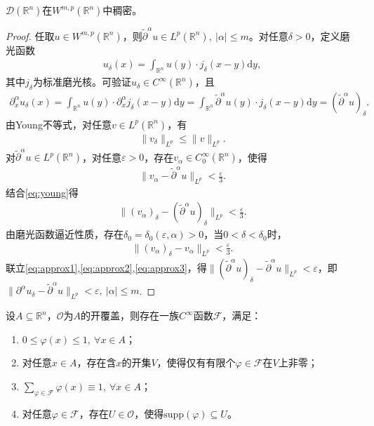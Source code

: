 \documentclass[../../main.tex]{subfiles}%
\begin{document}
\begin{theorem}
$\mathscr{D}(\mathbb{R}^{n})$在$W^{m,p}(\mathbb{R}^{n})$中稠密。
\end{theorem}

\begin{proof}
任取$u\in W^{m,p}(\mathbb{R}^{n})$，则$\widetilde{\partial}^{\alpha}u\in L^{p}(\mathbb{R}^{n}),\ |\alpha|\leqslant m$。对任意$\delta>0$，定义磨光函数
\begin{align}
u_{\delta}(x)=\int_{\mathbb{R}^{n}}u(y)\cdot j_{\delta}(x-y)\mathrm{d}y,\label{eq:mollify}
\end{align}
其中$j_{\delta}$为标准磨光核。可验证$u_{\delta}\in C^{\infty}(\mathbb{R}^{n})$，且
\begin{align*}
\partial_{x}^{\alpha}u_{\delta}(x)=\int_{\mathbb{R}^{n}}u(y)\cdot\partial_{x}^{\alpha}j_{\delta}(x-y)\mathrm{d}y=\int_{\mathbb{R}^{n}}\widetilde{\partial}^{\alpha}u(y)\cdot j_{\delta}(x-y)\mathrm{d}y=(\widetilde{\partial}^{\alpha}u)_{\delta}.
\end{align*}
由Young不等式，对任意$v\in L^{p}(\mathbb{R}^{n})$，有
\begin{align}
\|v_{\delta}\|_{L^{p}}\leqslant\|v\|_{L^{p}}.\label{eq:young}
\end{align}
对$\widetilde{\partial}^{\alpha}u\in L^{p}(\mathbb{R}^{n})$，对任意$\varepsilon>0$，存在$v_{\alpha}\in C_{0}^{\infty}(\mathbb{R}^{n})$，使得
\begin{align}
\|v_{\alpha}-\widetilde{\partial}^{\alpha}u\|_{L^{p}}<\frac{\varepsilon}{3}.\label{eq:approx1}
\end{align}
结合\eqref{eq:young}得
\begin{align}
\|(v_{\alpha})_{\delta}-(\widetilde{\partial}^{\alpha}u)_{\delta}\|_{L^{p}}<\frac{\varepsilon}{3}.\label{eq:approx2}
\end{align}
由磨光函数逼近性质，存在$\delta_{0}=\delta_{0}(\varepsilon,\alpha)>0$，当$0<\delta<\delta_{0}$时，
\begin{align}
\|(v_{\alpha})_{\delta}-v_{\alpha}\|_{L^{p}}<\frac{\varepsilon}{3}.\label{eq:approx3}
\end{align}
联立\eqref{eq:approx1},\eqref{eq:approx2},\eqref{eq:approx3}，得$\|(\widetilde{\partial}^{\alpha}u)_{\delta}-\widetilde{\partial}^{\alpha}u\|_{L^{p}}<\varepsilon$，即$\|\partial^{\alpha}u_{\delta}-\widetilde{\partial}^{\alpha}u\|_{L^{p}}<\varepsilon,\ |\alpha|\leqslant m$.
\end{proof}

\begin{theorem}
设$A\subseteq\mathbb{R}^{n}$，$\mathscr{O}$为$A$的开覆盖，则存在一族$C^{\infty}$函数$\mathscr{F}$，满足：
\begin{enumerate}[(1)]
\item $0\leqslant\varphi(x)\leqslant 1,\ \forall x\in A$；
\item 对任意$x\in A$，存在含$x$的开集$V$，使得仅有有限个$\varphi\in\mathscr{F}$在$V$上非零；
\item $\sum\limits_{\varphi\in\mathscr{F}}\varphi(x)\equiv 1,\ \forall x\in A$；
\item 对任意$\varphi\in\mathscr{F}$，存在$U\in\mathscr{O}$，使得$\mathrm{supp}(\varphi)\subseteq U$。
\end{enumerate}
\end{theorem}
\end{document}
